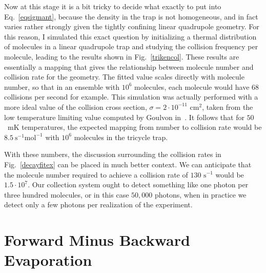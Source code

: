 Now at this stage it is a bit tricky to decide what exactly to put into Eq.~\ref{eqsigmant}, because the density in the trap is not homogeneous, and in fact varies rather strongly given the tightly confining linear quadrupole geometry.
For this reason, I simulated this exact question by initializing a thermal distribution of molecules in a linear quadrupole trap and studying the collision frequency per molecule, leading to the results shown in Fig.~\ref{trikencol}.
These results are essentially a mapping that gives the relationship between molecule number and collision rate for the geometry.
The fitted value scales directly with molecule number, so that in an ensemble with $10^6$ molecules, each molecule would have $68$ collisions per second for example.
This simulation was actually performed with a more ideal value of the collision cross section, $\sigma = 2\cdot10^{-11}\text{ cm}^2$, taken from the low temperature limiting value computed by Goulvon in~\citep[Fig.~1b]{Stuhl2012evap}.
It follows that for $50$~mK temperatures, the expected mapping from number to collision rate would be $8.5~\text{s}^{-1}\text{mol}^{-1}$ with $10^6$ molecules in the tricycle trap.

With these numbers, the discussion surrounding the collision rates in Fig.~\ref{decayfitex} can be placed in much better context.
We can anticipate that the molecule number required to achieve a collision rate of $130\text{ s}^{-1}$ would be $1.5\cdot10^7$.
Our collection system ought to detect something like one photon per three hundred molecules, or in this case $50,000$ photons, when in practice we detect only a few photons per realization of the experiment.

\section{Forward Minus Backward Evaporation}

